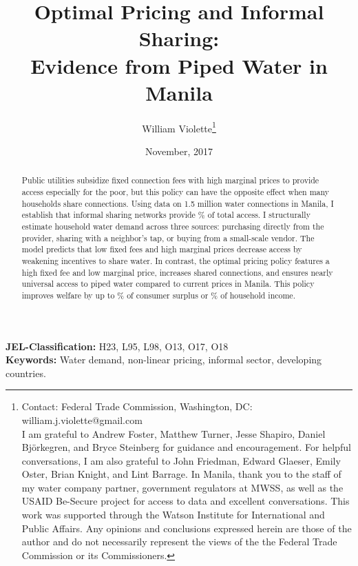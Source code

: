 \documentclass[12pt]{article}
\title{ Optimal Pricing and Informal Sharing: \\ Evidence from Piped Water in Manila }
\author{William Violette\thanks{Contact: Federal Trade Commission, Washington, DC: william.j.violette@gmail.com \\ I am grateful to Andrew Foster, Matthew Turner, Jesse Shapiro, Daniel Bj\"{o}rkegren, and Bryce Steinberg for guidance and encouragement.  For helpful conversations, I am also grateful to John Friedman, Edward Glaeser, Emily Oster, Brian Knight, and Lint Barrage.  In Manila, thank you to the staff of my water company partner, government regulators at MWSS, as well as the USAID Be-Secure project for access to data and excellent conversations.  This work was supported through the Watson Institute for International and Public Affairs.  Any opinions and conclusions expressed herein are those of the author and do not necessarily represent the views of the the Federal Trade Commission or its Commissioners.}
 }
\date{November, 2017}
\begin{document}
\maketitle
\begin{abstract}


	Public utilities subsidize fixed connection fees with high marginal prices to provide access especially for the poor, but this policy can have the opposite effect when many households share connections.  Using data on 1.5 million water connections in Manila, I establish that informal sharing networks provide \unskip\% 
	of total access.  I structurally estimate household water demand across three sources: purchasing directly from the provider, sharing with a neighbor's tap, or buying from a small-scale vendor.  The model predicts that low fixed fees and high marginal prices decrease access by weakening incentives to share water.  In contrast, the optimal pricing policy features a high fixed fee and low marginal price, increases shared connections, and ensures nearly universal access to piped water compared to current prices in Manila.  This policy improves welfare by up to \unskip\% of consumer surplus or \unskip\% of household income.

	


\end{abstract} 
{\bf JEL-Classification:} H23, L95, L98, O13, O17, O18 \\
\vspace{.1cm}
{\bf Keywords:} Water demand, non-linear pricing, informal sector, developing countries. 
\end{document}
